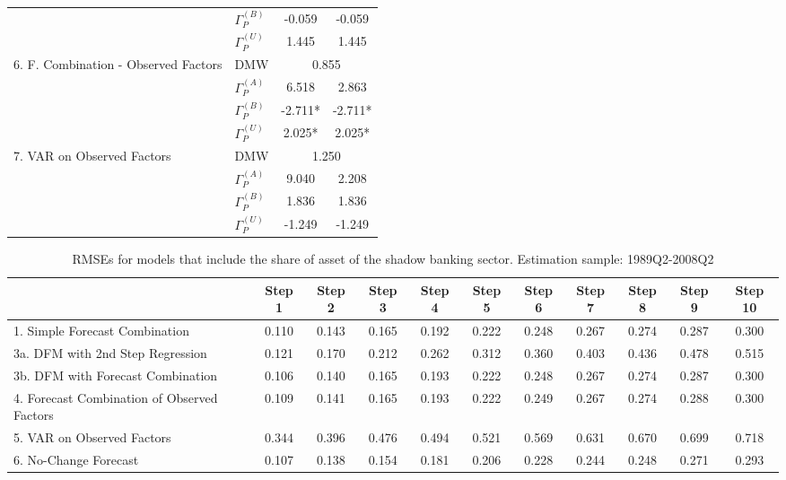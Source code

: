 \documentclass[11pt]{article}
\begin{document}
\begin{table}
\begin{tabular}{|l|l|c|c|}
& $\Gamma_P^{(B)}$&-0.059&-0.059\\                                     
& $\Gamma_P^{(U)}$&1.445&1.445\\                                       
\hline                                                                 
6. F. Combination - Observed Factors& DMW&\multicolumn{2}{|c|}{0.855}\\
\hline                                                                 
& $\Gamma_P^{(A)}$&6.518&2.863\\                                       
& $\Gamma_P^{(B)}$&-2.711*&-2.711*\\                                   
& $\Gamma_P^{(U)}$&2.025*&2.025*\\                                     
\hline                                                                 
7. VAR on Observed Factors          & DMW&\multicolumn{2}{|c|}{1.250}\\
\hline                                                                 
& $\Gamma_P^{(A)}$&9.040&2.208\\                                       
& $\Gamma_P^{(B)}$&1.836&1.836\\                                       
& $\Gamma_P^{(U)}$&-1.249&-1.249\\                                     
\hline                                                                 
\end{tabular}                                                          
\end{table}  





\newpage
{\normalsize \clearpage
\begin{table}
\caption{RMSEs for models that include the share of asset of the shadow banking sector. Estimation sample: 1989Q2-2008Q2} \label{table_rmse_competition}
\center
\begin{tabular}{|l|c|c|c|c|c|c|c|c|c|c|}
\hline
&Step 1 &Step 2 &Step 3 &Step 4 &Step 5 &Step 6 &Step 7 &Step 8 &Step 9 &Step 10\\
\hline
1. Simple Forecast Combination             &0.110&0.143&0.165&0.192&0.222&0.248&0.267&0.274&0.287&0.300\\
3a. DFM with 2nd Step Regression           &0.121&0.170&0.212&0.262&0.312&0.360&0.403&0.436&0.478&0.515\\
3b. DFM with Forecast Combination          &0.106&0.140&0.165&0.193&0.222&0.248&0.267&0.274&0.287&0.300\\
4. Forecast Combination of Observed Factors&0.109&0.141&0.165&0.193&0.222&0.249&0.267&0.274&0.288&0.300\\
5. VAR on Observed Factors                 &0.344&0.396&0.476&0.494&0.521&0.569&0.631&0.670&0.699&0.718\\
6. No-Change Forecast                      &0.107&0.138&0.154&0.181&0.206&0.228&0.244&0.248&0.271&0.293\\
\hline
\end{tabular}
\end{table}
}
\end{document}
